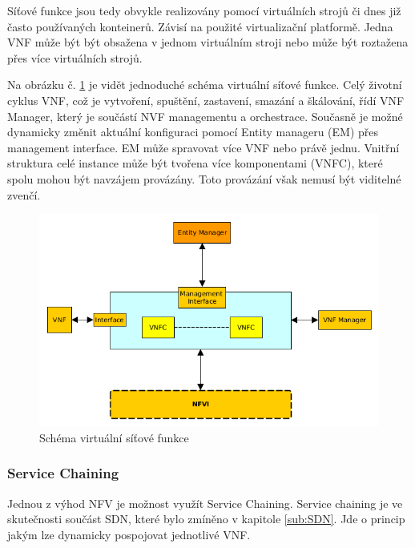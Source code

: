 Síťové funkce jsou tedy obvykle realizovány pomocí virtuálních strojů či dnes již často používaných konteinerů. Závisí na použité virtualizační platformě. Jedna VNF může být být obsažena v jednom virtuálním stroji nebo může být roztažena přes více virtuálních strojů. 

Na obrázku č. \ref{fig:VNF} je vidět jednoduché schéma virtuální síťové funkce. Celý životní cyklus VNF, což je vytvoření, spuštění, zastavení, smazání a škálování, řídí VNF Manager, který je součástí NVF managementu a orchestrace. Současně je možné dynamicky změnit aktuální konfiguraci pomocí Entity manageru (EM) přes management interface. EM může spravovat více VNF nebo právě jednu. Vnitřní struktura celé instance může být tvořena více komponentami (VNFC), které spolu mohou být navzájem provázány. Toto provázání však nemusí být viditelné zvenčí.

\begin{figure}[h]
\begin{centering}
\includegraphics[scale=0.67]{images/VNF}
\par\end{centering}
\caption{Schéma virtuální síťové funkce\label{fig:VNF}}
\end{figure}

\subsubsection{Service Chaining}

Jednou z výhod NFV je možnost využít Service Chaining. Service chaining je ve skutečnosti součást SDN, které bylo zmíněno v kapitole \ref{sub:SDN}. Jde o princip jakým lze dynamicky pospojovat jednotlivé VNF. \cite{SDN_book}

